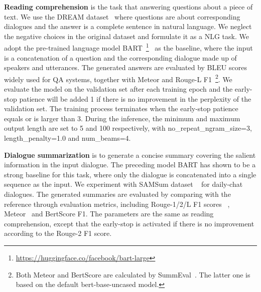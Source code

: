 \textbf{Reading comprehension} is the task that answering questions about a piece of text. We use the DREAM dataset~\cite{sun2019dream} where questions are about corresponding dialogues and the answer is a complete sentence in natural language. We neglect the negative choices in the original dataset and formulate it as a NLG task. We adopt the pre-trained language model BART~\footnote{\url{https://huggingface.co/facebook/bart-large}}~\cite{lewis2020bart} as the baseline, where the input is a concatenation of a question and the corresponding dialogue made up of speakers and utterances. 
The generated answers are evaluated by BLEU scores%
~\cite{papineni2002bleu} widely used for QA systems, together with Meteor and Rouge-L F1~\footnote{Both Meteor and BertScore are calculated by SummEval~\cite{fabbri2021summeval}. %
The latter one is based on the default bert-base-uncased model.}. 
We evaluate the model on the validation set after each training epoch and the early-stop patience will be added 1 if there is no improvement 
in the perplexity of the validation set. The training process terminates when the early-stop patience equals or is larger than 3.  During the inference, the minimum and maximum output length are set to 5 and 100 respectively, with no\_repeat\_ngram\_size=3, length\_penalty=1.0 and num\_beams=4.



\textbf{Dialogue summarization} is to generate a concise summary covering the salient information in the input dialogue. The preceding model BART has shown to be a strong baseline for this task, where only the dialogue is concatenated into a single sequence as the input. We experiment with  %
SAMSum dataset
~\cite{gliwa2019samsum} for daily-chat dialogues. 
The generated summaries are evaluated by comparing with the reference through evaluation metrics, including Rouge-1/2/L F1 scores %
~\cite{lin2004rouge}, Meteor~\cite{banerjee2005meteor} and BertScore F1. %
The parameters are the same as reading comprehension, except that the early-stop is activated if there is no improvement according to the Rouge-2 F1 score. 


